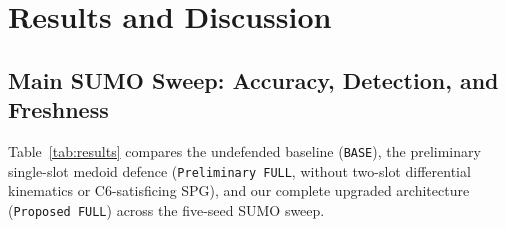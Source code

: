\documentclass[conference]{IEEEtran}
\begin{document}
\section{Results and Discussion}

\subsection{Main SUMO Sweep: Accuracy, Detection, and Freshness}
Table~\ref{tab:results} compares the undefended baseline (\texttt{BASE}), the preliminary single-slot medoid defence (\texttt{Preliminary FULL}, without two-slot differential kinematics or C6-satisficing SPG), and our complete upgraded architecture (\texttt{Proposed FULL}) across the five-seed SUMO sweep.
\end{document}

